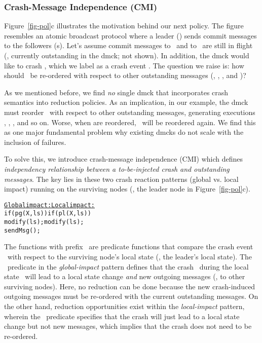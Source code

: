 

\subsubsection{Crash-Message Independence (CMI)}
\label{sam-cmi}


Figure~\ref{fig-pol}c illustrates the motivation behind our next
policy.  The figure resembles an atomic broadcast protocol where a
leader () sends commit messages to the followers (s).
Let's assume commit messages  to \fone\ and  to \ftwo\
are still in flight (\ie, currently outstanding in the dmck; not
shown).  In addition, the dmck would like to crash \ftri, which we
label as a crash event \xx.  The question we raise is: how should \xx\
be re-ordered with respect to other outstanding messages
(\ma, \mb, \mc, and \md)?


As we mentioned before, we find {\em no} single dmck that incorporates
crash semantics into reduction policies.  As an implication, in our
example, the dmck must reorder \xx\ with respect to other outstanding
messages, generating executions \ts{Xabcd}, \ts{aXbcd}, \ts{abXcd},
and so on.  Worse, when \ts{abcd} are reordered, \xx\ will be
reordered again.  We find this as one major fundamental problem why
existing dmcks do not scale with the inclusion of failures.

To solve this, we introduce crash-message independence (CMI) which
defines {\em independency relationship between a to-be-injected crash
and outstanding messages}.  The key lies in these two crash reaction
patterns (global vs. local impact) running on the surviving nodes
(\eg, the leader node in Figure~\ref{fig-pol}c).


{\small
\begin{alltt}
      \underline{Global impact:}       \underline{Local impact:}
      if (pg(X,ls))         if (pl(X,ls)) 
        modify(ls);           modify(ls);
        sendMsg();           
\end{alltt}
}


The functions with prefix \pp\ are predicate functions that compare
the crash event \xx\ with respect to the surviving node's local state
(\eg, the leader's local state).  The \pg\ predicate in the {\em
global-impact} pattern defines that the crash \xx\ during the local
state \ls\ will lead to a local state change {\em and} new outgoing
messages (\eg, to other surviving nodes).  Here, no reduction can be
done because the new crash-induced outgoing messages must be
re-ordered with the current outstanding messages.  On the other hand,
reduction opportunities exist within the {\em local-impact} pattern,
wherein the \pl\ predicate specifies that the crash will just lead to
a local state change but not new messages, which implies that the
crash does not need to be re-ordered.  


